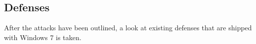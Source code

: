 \subsection{Defenses}
\label{sec:defenses}
After the attacks have been outlined, a look at existing defenses that are shipped with Windows 7 is taken.


